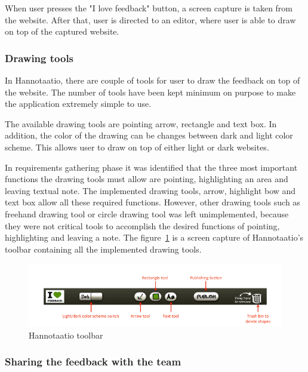 \documentclass[english,12pt,a4paper,pdftex]{article}
\begin{document}
When user presses the "I love feedback" button, a screen capture is taken from the website. After that, user is directed to an editor, where user is able to draw on top of the captured website.

\subsubsection{Drawing tools}

In Hannotaatio, there are couple of tools for user to draw the feedback on top of the website. The number of tools have been kept minimum on purpose to make the application extremely simple to use.

The available drawing tools are pointing arrow, rectangle and text box. In addition, the color of the drawing can be changes between dark and light color scheme. This allows user to draw on top of either light or dark websites.

In requirements gathering phase it was identified that the three most important functions the drawing tools must allow are pointing, highlighting an area and leaving textual note. The implemented drawing tools, arrow, highlight bow and text box allow all these required functions. However, other drawing tools such as freehand drawing tool or circle drawing tool was left unimplemented, because they were not critical tools to accomplish the desired functions of pointing, highlighting and leaving a note. The figure~\ref{fig:hannotaatio_toolbar} is a screen capture of Hannotaatio's toolbar containing all the implemented drawing tools.

\begin{figure}[htb]
\begin{center}
\includegraphics[width=1.0\textwidth]{drawing_tools_annotated_crop.png}
\end{center}
\caption{Hannotaatio toolbar}
\label{fig:hannotaatio_toolbar}
\end{figure}

\subsubsection{Sharing the feedback with the team}
\end{document}
